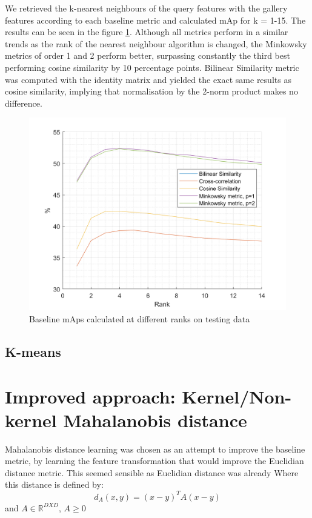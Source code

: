 \documentclass[10pt,technote]{IEEEtran}
\begin{document}
We retrieved the k-nearest neighbours of the query features with the gallery features according to each baseline metric and calculated mAp for k = 1-15. The results can be seen in the figure \ref{fig:baseline_map}. Although all metrics perform in a similar trends as the rank of the nearest neighbour algorithm is changed, the Minkowsky metrics of order 1 and 2 perform better, surpassing constantly the third best performing cosine similarity by 10 percentage points. Bilinear Similarity metric was computed with the identity matrix and yielded the exact same results as cosine similarity, implying that normalisation by the 2-norm product makes no difference.
\begin{figure}
    \centering
    \includegraphics[width=\linewidth]{Graphs/mAp_vs_rank_baseline.png}
    \caption{Baseline mAps calculated at different ranks on testing data}
    \label{fig:baseline_map}
\end{figure}
\subsection{K-means}

\section{Improved approach: Kernel/Non-kernel Mahalanobis distance}
Mahalanobis distance learning was chosen as an attempt to improve the baseline metric, by learning the feature transformation that would improve the Euclidian distance metric. This seemed sensible as Euclidian distance was already 
Where this distance is defined by:
\begin{equation}
    d_A(x, y) = (x - y)^TA(x - y)
\end{equation}
and $A \in \mathbb{R}^{DXD}$, $A \ge 0$
\end{document}

